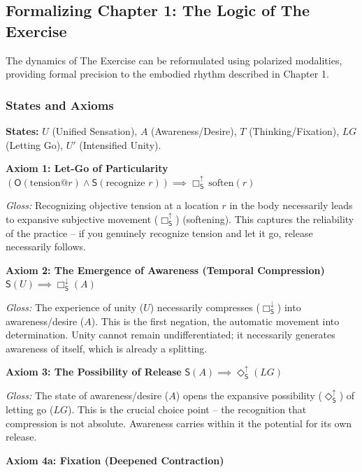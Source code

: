\documentclass[12pt]{book}
\newcommand{\SBoxUp}{\Box_{\mathsf{S}}^{\uparrow}}
\newcommand{\SBoxDown}{\Box_{\mathsf{S}}^{\downarrow}}
\newcommand{\SDiaUp}{\Diamond_{\mathsf{S}}^{\uparrow}}
\begin{document}
\subsection{Formalizing Chapter 1: The Logic of The Exercise}

The dynamics of The Exercise can be reformulated using polarized modalities, providing formal precision to the embodied rhythm described in Chapter 1.

\subsubsection{States and Axioms}

\textbf{States:} $U$ (Unified Sensation), $A$ (Awareness/Desire), $T$ (Thinking/Fixation), $LG$ (Letting Go), $U'$ (Intensified Unity).

\bigskip

\noindent\textbf{Axiom 1: Let-Go of Particularity}
$ (\mathsf{O}(\text{tension@}r) \wedge \mathsf{S}(\text{recognize }r)) \implies \SBoxUp\,\text{soften}(r) $

\textit{Gloss:} Recognizing objective tension at a location $r$ in the body necessarily leads to expansive subjective movement ($\SBoxUp$) (softening). This captures the reliability of the practice -- if you genuinely recognize tension and let it go, release necessarily follows.

\bigskip

\noindent\textbf{Axiom 2: The Emergence of Awareness (Temporal Compression)}
$ \mathsf{S}(U) \implies \SBoxDown(A) $

\textit{Gloss:} The experience of unity ($U$) necessarily compresses ($\SBoxDown$) into awareness/desire ($A$). This is the first negation, the automatic movement into determination. Unity cannot remain undifferentiated; it necessarily generates awareness of itself, which is already a splitting.

\bigskip

\noindent\textbf{Axiom 3: The Possibility of Release}
$ \mathsf{S}(A) \implies \SDiaUp(LG) $

\textit{Gloss:} The state of awareness/desire ($A$) opens the expansive possibility ($\SDiaUp$) of letting go ($LG$). This is the crucial choice point -- the recognition that compression is not absolute. Awareness carries within it the potential for its own release.

\bigskip

\noindent\textbf{Axiom 4a: Fixation (Deepened Contraction)}
\end{document}

